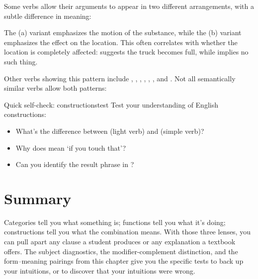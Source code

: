 Some verbs allow their arguments to appear in two different arrangements, with a subtle difference in meaning:

\ea\label{ex:spray-load}
   \z
\ex
   \z
\z
The (a) variant emphasizes the motion of the substance, while the (b)  variant  emphasizes the effect on the location. This often correlates with whether the location is completely affected:  suggests the truck becomes full, while  implies no such thing.

Other verbs showing this pattern include , , , , , , and . Not all semantically similar verbs allow both patterns:

\ea\label{ex:spray-load-gaps}
   \z
\z

\begin{tblsframedsymbol}{Quick self-check: constructions}{test}
Test your understanding of English constructions:
\begin{itemize}[noitemsep, leftmargin=*]
    \item What's the difference between  (light verb) and  (simple verb)?
    \item Why does  mean `if you touch that'?
    \item Can you identify the result phrase in ?
\end{itemize}
\end{tblsframedsymbol}

\section{Summary}

Categories tell you what something is; functions tell you what it's doing; constructions tell you what the combination means. With those three lenses, you can pull apart any clause a student produces or any explanation a textbook offers. The subject diagnostics, the modifier-complement distinction, and the form--meaning pairings from this chapter give you the specific tests to back up your intuitions, or to discover that your intuitions were wrong.
